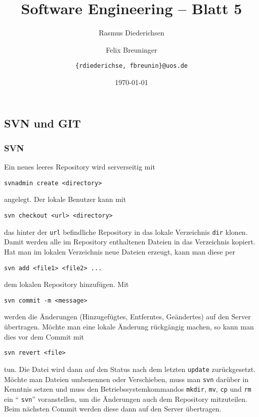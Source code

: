 \documentclass{scrartcl}
\title{\rmfamily Software Engineering -- Blatt 5}
\author{Rasmus Diederichsen \and Felix Breuninger\and 
   \texttt{\{rdiederichse, fbreunin\}@uos.de}
}
\date{\today}
\begin{document}
\selectfont
\maketitle

\setcounter{section}{5}
\setcounter{subsection}{0}

\subsection{SVN und GIT}

\subsubsection{SVN}

Ein neues leeres Repository wird serverseitig mit 
\begin{lstlisting}
svnadmin create <directory>
\end{lstlisting} angelegt. Der lokale Benutzer kann mit 
\begin{lstlisting}
svn checkout <url> <directory>
\end{lstlisting} das hinter der \texttt{url}
 befindliche Repository in das lokale Verzeichnis 
\texttt{dir} klonen. Damit werden alle im Repository enthaltenen Dateien in das
Verzeichnis kopiert. Hat man im lokalen Verzeichnis neue Dateien erzeugt, kann
man diese per 
\begin{lstlisting}
svn add <file1> <file2> ...
\end{lstlisting} dem lokalen Repository hinzufügen. Mit 
\begin{lstlisting}
svn commit -m <message>
\end{lstlisting} werden die Änderungen
(Hinzugefügtes, Entferntes, Geändertes) auf den Server übertragen. Möchte man
eine lokale Änderung rückgängig machen, so kann man dies vor dem Commit mit

\begin{lstlisting}
svn revert <file>
\end{lstlisting}
 tun. Die Datei wird dann auf den Status nach dem
letzten \texttt{update} zurückgesetzt. Möchte man Dateien umbenennen oder
Verschieben, muss man 
\texttt{svn} darüber in Kenntnis setzen und muss den
Betriebssystemkommandos 
\texttt{mkdir}, \texttt{mv}, \texttt{cp} und 
\texttt{rm} ein `` \texttt{svn}''
voranstellen, um die Änderungen auch dem Repository mitzuteilen. Beim nächsten
Commit werden diese dann auf den Server übertragen.
\end{document}
